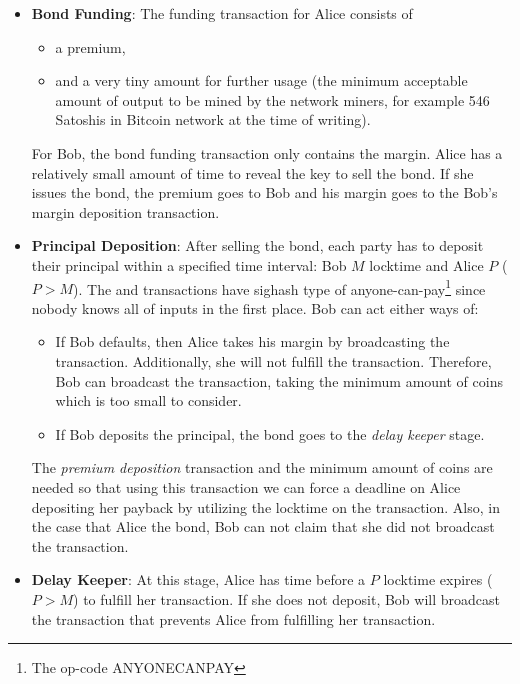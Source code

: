 \begin{itemize}
    \item \textbf{Bond Funding}: 
    The funding transaction for Alice consists of 
    \begin{itemize}
        \item a premium, 
        \item and a very tiny amount for further usage (the minimum acceptable amount of output to be mined by the network miners, for example 546 Satoshis in Bitcoin network at the time of writing).
    \end{itemize}
    For Bob, the bond funding transaction only contains the margin. Alice has a relatively small amount of time to reveal the \Aone  key to sell the bond. If she issues the bond, the premium goes to Bob and his margin goes to the Bob's margin deposition transaction.
    
    \item \textbf{Principal Deposition}: 
    After selling the bond, each party has to deposit their principal within a specified time interval: Bob $M$ locktime and Alice $P$ ($P > M$). The \emph{ } and   transactions have sighash type of anyone-can-pay\footnote{The op-code ANYONECANPAY} since nobody knows all of  inputs in the first place. Bob can act either ways of:
    \begin{itemize}
        \item If Bob defaults, then Alice takes his margin by broadcasting the  transaction. Additionally, she will not fulfill the  transaction. Therefore, Bob can broadcast the  transaction, taking the minimum amount of coins which is too small to consider.
        \item If Bob deposits the principal, the bond goes to the \emph{delay keeper} stage.
    \end{itemize}
    The \emph{premium deposition} transaction and the minimum amount of coins are needed so that using this transaction we can force a deadline on Alice depositing her payback by utilizing the locktime on the  transaction. Also, in the case that Alice  the bond, Bob can not claim that she did not broadcast the  transaction.
    
    \item \textbf{Delay Keeper}: At this stage, Alice has time before a $P$ locktime expires ($P > M$) to fulfill her  transaction. If she does not deposit, Bob will broadcast the  transaction that prevents Alice from fulfilling her  transaction. 
    

\end{itemize}

